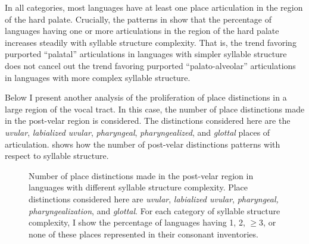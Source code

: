   In all categories, most languages have at least one place articulation in the region of the hard palate. Crucially, the patterns in  show that the percentage of languages having one or more articulations in the region of the hard palate increases steadily with syllable structure complexity. That is, the trend favoring purported ``palatal'' articulations in languages with simpler syllable structure does not cancel out the trend favoring purported ``palato-alveolar'' articulations in languages with more complex syllable structure.

  Below I present another analysis of the proliferation of place distinctions in a large region of the vocal tract. In this case, the number of place distinctions made in the post-velar region is considered. The distinctions considered here are the \textit{uvular}, \textit{labialized uvular}, \textit{pharyngeal}, \textit{pharyngealized}, and \textit{glottal} places of articulation.  shows how the number of post-velar distinctions patterns with respect to syllable structure.

\begin{figure}
\caption{\label{fig:4.11} Number of place distinctions made in the post-velar region in languages with different syllable structure complexity. Place distinctions considered here are \textit{uvular}, \textit{labialized uvular}, \textit{pharyngeal, pharyngealization}, and \textit{glottal}. For each category of syllable structure complexity, I show the percentage of languages having 1, 2, ${\geq}$3, or none of these places represented in their consonant inventories.}
\end{figure}

